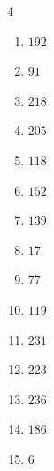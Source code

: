 \begin{multicols}{4}
\begin{enumerate}

  \item $192$


  \item $91$


  \item $218$


  \item $205$


  \item $118$


  \item $152$


  \item $139$


  \item $17$


  \item $77$


  \item $119$


  \item $231$


  \item $223$


  \item $236$


\columnbreak %

  \item $186$


  \item $6$



\end{enumerate}
\end{multicols}
